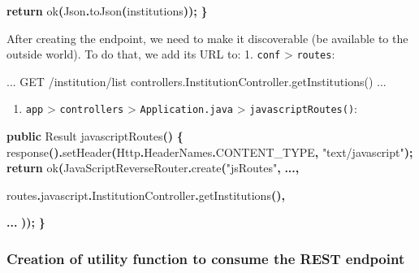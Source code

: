 \documentclass[
  11pt,
]{krantz}
\newenvironment{Shaded}{\begin{snugshade}}{\end{snugshade}}
\newcommand{\BuiltInTok}[1]{#1}
\newcommand{\ControlFlowTok}[1]{\textcolor[rgb]{0.27,0.27,0.27}{\textbf{#1}}}
\newcommand{\FunctionTok}[1]{\textcolor[rgb]{0,0,0}{#1}}
\newcommand{\KeywordTok}[1]{\textcolor[rgb]{0.27,0.27,0.27}{\textbf{#1}}}
\newcommand{\NormalTok}[1]{#1}
\newcommand{\OperatorTok}[1]{\textcolor[rgb]{0.43,0.43,0.43}{\textbf{#1}}}
\newcommand{\StringTok}[1]{\textcolor[rgb]{0.5,0.5,0.5}{#1}}
\providecommand{\tightlist}{%
  \setlength{\itemsep}{0pt}\setlength{\parskip}{0pt}}
\begin{document}
\begin{Shaded}
\begin{Highlighting}[]
    \ControlFlowTok{return} \FunctionTok{ok}\OperatorTok{(}\NormalTok{Json}\OperatorTok{.}\FunctionTok{toJson}\OperatorTok{(}\NormalTok{institutions}\OperatorTok{));}
\OperatorTok{\}}
\end{Highlighting}
\end{Shaded}

After creating the endpoint, we need to make it discoverable (be available to the outside world). To do that, we add its URL to:
1. \texttt{conf} \textgreater{} \texttt{routes}:

\begin{Shaded}
\begin{Highlighting}[]
\NormalTok{...}
\NormalTok{GET          /institution/list                    controllers.InstitutionController.getInstitutions()}
\NormalTok{...}
\end{Highlighting}
\end{Shaded}

\begin{enumerate}
\def\labelenumi{\arabic{enumi}.}
\setcounter{enumi}{1}
\tightlist
\item
  \texttt{app} \textgreater{} \texttt{controllers} \textgreater{} \texttt{Application.java} \textgreater{} \texttt{javascriptRoutes()}:
\end{enumerate}

\begin{Shaded}
\begin{Highlighting}[]
\KeywordTok{public} \BuiltInTok{Result} \FunctionTok{javascriptRoutes}\OperatorTok{()} \OperatorTok{\{}
    \FunctionTok{response}\OperatorTok{().}\FunctionTok{setHeader}\OperatorTok{(}\NormalTok{Http}\OperatorTok{.}\FunctionTok{HeaderNames}\OperatorTok{.}\FunctionTok{CONTENT\_TYPE}\OperatorTok{,} \StringTok{"text/javascript"}\OperatorTok{);}
    \ControlFlowTok{return} \FunctionTok{ok}\OperatorTok{(}\NormalTok{JavaScriptReverseRouter}\OperatorTok{.}\FunctionTok{create}\OperatorTok{(}\StringTok{"jsRoutes"}\OperatorTok{,}
        \KeywordTok{...}\OperatorTok{,}

\NormalTok{        routes}\OperatorTok{.}\FunctionTok{javascript}\OperatorTok{.}\FunctionTok{InstitutionController}\OperatorTok{.}\FunctionTok{getInstitutions}\OperatorTok{(),}

        \KeywordTok{...}
    \OperatorTok{));}
\OperatorTok{\}}
\end{Highlighting}
\end{Shaded}

\hypertarget{creation-of-utility-function-to-consume-the-rest-endpoint}{%
\subsubsection{Creation of utility function to consume the REST endpoint}\label{creation-of-utility-function-to-consume-the-rest-endpoint}}
\end{document}
